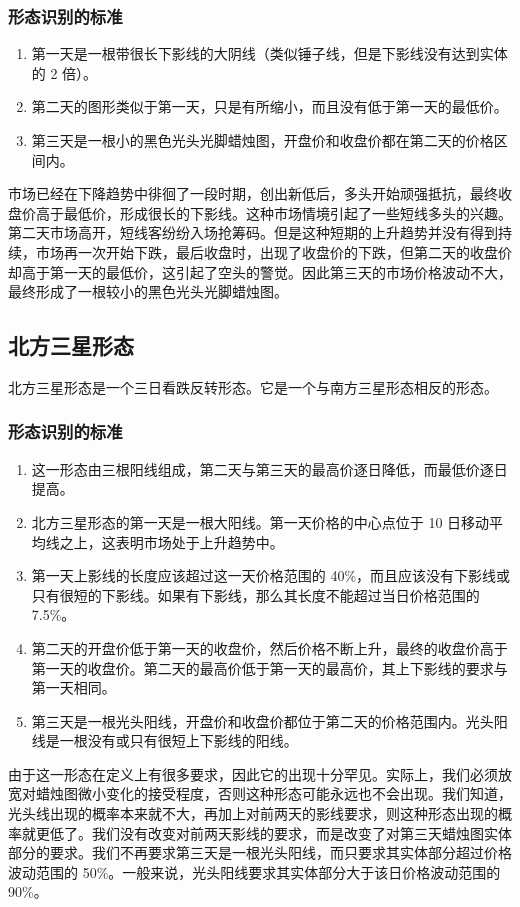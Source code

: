 \subsubsection*{形态识别的标准}
\begin{enumerate}
    \item 第一天是一根带很长下影线的大阴线（类似锤子线，但是下影线没有达到实体的 2 倍）。
    \item 第二天的图形类似于第一天，只是有所缩小，而且没有低于第一天的最低价。
    \item 第三天是一根小的黑色光头光脚蜡烛图，开盘价和收盘价都在第二天的价格区间内。
\end{enumerate}

市场已经在下降趋势中徘徊了一段时期，创出新低后，多头开始顽强抵抗，最终收盘价高于最低价，形成很长的下影线。这种市场情境引起了一些短线多头的兴趣。第二天市场高开，短线客纷纷入场抢筹码。但是这种短期的上升趋势并没有得到持续，市场再一次开始下跌，最后收盘时，出现了收盘价的下跌，但第二天的收盘价却高于第一天的最低价，这引起了空头的警觉。因此第三天的市场价格波动不大，最终形成了一根较小的黑色光头光脚蜡烛图。
\subsection{北方三星形态}
北方三星形态是一个三日看跌反转形态。它是一个与南方三星形态相反的形态。
\subsubsection*{形态识别的标准}
\begin{enumerate}
    \item 这一形态由三根阳线组成，第二天与第三天的最高价逐日降低，而最低价逐日提高。
    \item 北方三星形态的第一天是一根大阳线。第一天价格的中心点位于 10 日移动平均线之上，这表明市场处于上升趋势中。
    \item 第一天上影线的长度应该超过这一天价格范围的 40\%，而且应该没有下影线或只有很短的下影线。如果有下影线，那么其长度不能超过当日价格范围的 7.5\%。
    \item 第二天的开盘价低于第一天的收盘价，然后价格不断上升，最终的收盘价高于第一天的收盘价。第二天的最高价低于第一天的最高价，其上下影线的要求与第一天相同。
    \item 第三天是一根光头阳线，开盘价和收盘价都位于第二天的价格范围内。光头阳线是一根没有或只有很短上下影线的阳线。
\end{enumerate}
由于这一形态在定义上有很多要求，因此它的出现十分罕见。实际上，我们必须放宽对蜡烛图微小变化的接受程度，否则这种形态可能永远也不会出现。我们知道，光头线出现的概率本来就不大，再加上对前两天的影线要求，则这种形态出现的概率就更低了。我们没有改变对前两天影线的要求，而是改变了对第三天蜡烛图实体部分的要求。我们不再要求第三天是一根光头阳线，而只要求其实体部分超过价格波动范围的 50\%。一般来说，光头阳线要求其实体部分大于该日价格波动范围的 90\%。
